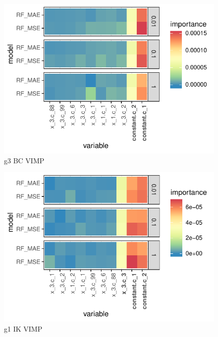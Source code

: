 \documentclass[11pt, a4paper, table]{article}
\begin{document}
\begin{figure}
	\includegraphics[]{../Results/simulation/graphics/simulation_g3_vimp_bc.pdf}
	\caption{g3 BC VIMP}
\end{figure}


\begin{figure}
	\includegraphics[]{../Results/simulation/graphics/simulation_g1_vimp_ik.pdf}
	\caption{g1 IK VIMP}
\end{figure}
\end{document}

